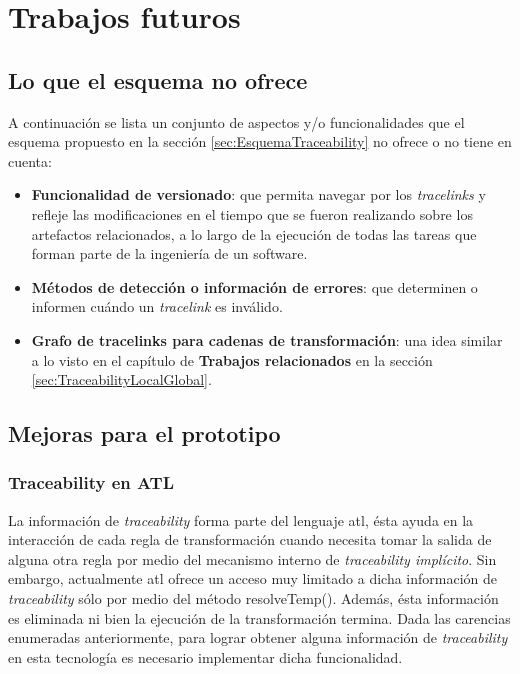 \documentclass[a4paper,12pt,twoside,spanish,openright]{book}
\begin{document}
\chapter{Trabajos futuros}

\section*{Lo que el esquema no ofrece}
\label{sec:LoQueNoOfrece}

A continuación se lista un conjunto de aspectos y/o funcionalidades que el esquema propuesto en la sección \ref{sec:EsquemaTraceability} no ofrece o no tiene en cuenta:


\begin{itemize}

\item \textbf{Funcionalidad de versionado}: que permita navegar por los \textit{tracelinks} y refleje las modificaciones en el tiempo que se fueron realizando sobre los artefactos relacionados, a lo largo de la ejecución de todas las tareas que forman parte de la ingeniería de un software.

\item \textbf{Métodos de detección o información de errores}: que determinen o informen cuándo un \textit{tracelink} es inválido.

\item \textbf{Grafo de tracelinks para cadenas de transformación}: una idea similar a lo visto en el capítulo de \textbf{Trabajos relacionados} en la sección \ref{sec:TraceabilityLocalGlobal}.

\end{itemize}


\section*{Mejoras para el prototipo}


\subsection*{Traceability en ATL}
\label{cap:ATLTtraceability}

La información de \textit{traceability} forma parte del lenguaje \gls{atl}, ésta ayuda en la interacción de cada regla de transformación cuando necesita tomar la salida de alguna otra regla por medio del mecanismo interno de \textit{traceability implícito}. Sin embargo, actualmente \gls{atl} ofrece un acceso muy limitado a dicha información de \textit{traceability} sólo por medio del método \textsf{resolveTemp()}. Además, ésta información es eliminada ni bien la ejecución de la transformación termina. Dada las carencias enumeradas anteriormente, para lograr obtener alguna información de \textit{traceability} en esta tecnología es necesario implementar dicha funcionalidad.
\end{document}
